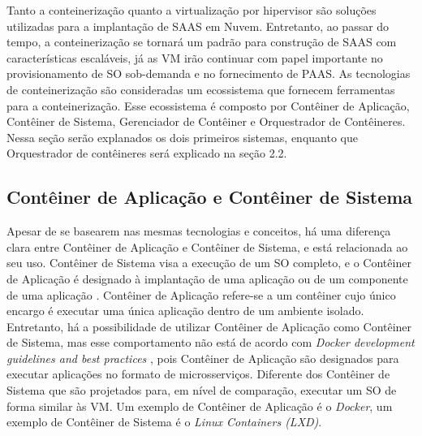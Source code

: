 Tanto a conteinerização quanto a virtualização por hipervisor são soluções utilizadas para a implantação de \ac{SAAS} em Nuvem. Entretanto, ao passar do tempo, a conteinerização se tornará um padrão para construção de \ac{SAAS} com características escaláveis, já as \ac{VM} irão continuar com papel importante no provisionamento de \ac{SO} sob-demanda e no fornecimento de \ac{PAAS}.
%
As tecnologias de conteinerização são consideradas um ecossistema que fornecem ferramentas para a conteinerização. Esse ecossistema é composto por Contêiner de Aplicação, Contêiner de Sistema, Gerenciador de Contêiner e Orquestrador de Contêineres. Nessa seção serão explanados os dois primeiros sistemas, enquanto que Orquestrador de contêineres será explicado na seção 2.2.

\subsection{Contêiner de Aplicação e Contêiner de Sistema}
Apesar de se basearem nas mesmas tecnologias e conceitos, há uma diferença clara entre Contêiner de Aplicação e Contêiner de Sistema, e está relacionada ao seu uso. Contêiner de Sistema visa a execução de um \ac{SO} completo, e o Contêiner de Aplicação é designado à implantação de uma aplicação ou de um componente de uma aplicação \newline \cite{casalicchio2020state}. Contêiner de Aplicação refere-se a um contêiner cujo único encargo é executar uma única aplicação dentro de um ambiente isolado. Entretanto, há a possibilidade de utilizar Contêiner de Aplicação como Contêiner de Sistema, mas esse comportamento não está de acordo com \textit{Docker development guidelines and best practices} \cite{berg2016guidelines}, pois Contêiner de Aplicação são designados para executar aplicações no formato de microsserviços. Diferente dos Contêiner de Sistema que são projetados para, em nível de comparação, executar um \ac{SO} de forma similar às \ac{VM}. Um exemplo de Contêiner de Aplicação é o \textit{Docker}, um exemplo de Contêiner de Sistema é o \textit{Linux Containers (LXD)}.



